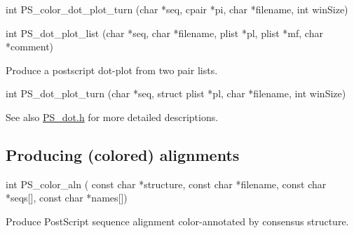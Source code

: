 \begin{DoxyVerb}int PS_color_dot_plot_turn (char *seq,
                            cpair *pi,
                            char *filename,
                            int winSize)
\end{DoxyVerb}


\begin{DoxyVerb}int PS_dot_plot_list (char *seq,
                      char *filename,
                      plist *pl,
                      plist *mf,
                      char *comment)
\end{DoxyVerb}
 Produce a postscript dot-\/plot from two pair lists.

\begin{DoxyVerb}int PS_dot_plot_turn (char *seq,
                      struct plist *pl,
                      char *filename,
                      int winSize)
\end{DoxyVerb}


\begin{DoxySeeAlso}{See also}
\mbox{\hyperlink{_p_s__dot_8h}{P\+S\+\_\+dot.\+h}} for more detailed descriptions.
\end{DoxySeeAlso}
\hypertarget{plots_utils_aln}{}\subsection{Producing (colored) alignments}\label{plots_utils_aln}
\begin{DoxyVerb}int PS_color_aln (
            const char *structure,
            const char *filename,
            const char *seqs[],
            const char *names[])
\end{DoxyVerb}
 Produce Post\+Script sequence alignment color-\/annotated by consensus structure. 